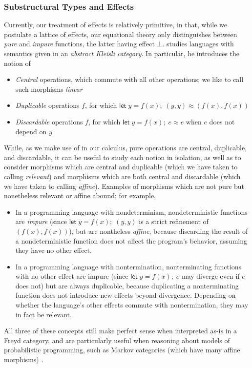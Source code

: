 \documentclass[acmsmall,screen,review]{acmart}
\newcommand{\ms}[1]{\ensuremath{\mathsf{#1}}}
\newcommand{\letexpr}[3]{\ensuremath{\ms{let}\;#1 = #2;\;#3}}
\newcommand{\teqv}{\approx}
\begin{document}
\subsubsection{Substructural Types and Effects}

Currently, our treatment of effects is relatively primitive, in that, while we postulate a lattice
of effects, our equational theory only distinguishes between \emph{pure} and \emph{impure}
functions, the latter having effect $\bot$. \citet{fuhrmann-direct-1999} studies languages with
semantics given in an \emph{abstract Kleisli category}. In particular, he introduces the notion of
\begin{itemize}
  \item \emph{Central} operations, which commute with all other operations; we like to call such
  morphisms \emph{linear}
  \item \emph{Duplicable} operations $f$, for which $\letexpr{y}{f(x)}{(y, y)} \teqv (f(x), f(x))$
  \item \emph{Discardable} operations $f$, for which $\letexpr{y}{f(x)}{e} \teqv e$ when $e$ does
  not depend on $y$
\end{itemize}
While, as we make use of in our calculus, pure operations are central, duplicable, and discardable,
it can be useful to study each notion in isolation, as well as to consider morphisms which are
central and duplicable (which we have taken to calling \emph{relevant}) and morphisms which are
both central and discardable (which we have taken to calling \emph{affine}). Examples of morphisms
which are not pure but nonetheless relevant or affine abound; for example,
\begin{itemize}
  \item In a programming language with nondeterminism, nondeterministic functions are \emph{impure}
  (since $\letexpr{y}{f(x)}{(y, y)}$ is a strict refinement of $(f(x), f(x))$), but are nontheless
  \emph{affine}, because discarding the result of a nondeterministic function does not affect the
  program's behavior, assuming they have no other effect.
  \item In a programming language with nontermination, nonterminating functions with no other effect
  are impure (since $\letexpr{y}{f(x)}{e}$ may diverge even if $e$ does not) but are always
  duplicable, because duplicating a nonterminating function does not introduce new effects beyond
  divergence. Depending on whether the language's other effects commute with nontermination, they
  may in fact be relevant.
\end{itemize}
All three of these concepts still make perfect sense when interpreted as-is in a Freyd category, and
are particularly useful when reasoning about models of probabilistic programming, such as Markov
categories (which have many affine morphisms) \cite{nlab:markov-category}.
\end{document}
